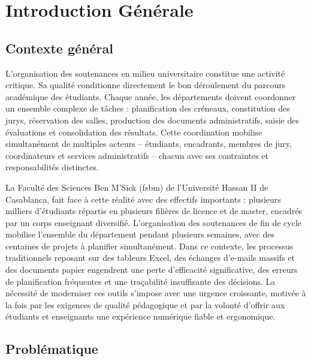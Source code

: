 \newpage
\section*{Introduction Générale}
\label{sec:introduction_generale}

\subsection*{Contexte général}
\label{intro:contexte}

L'organisation des soutenances en milieu universitaire constitue une activité critique. Sa qualité conditionne directement le bon déroulement du parcours académique des étudiants. Chaque année, les départements doivent coordonner un ensemble complexe de tâches : planification des créneaux, constitution des jurys, réservation des salles, production des documents administratifs, saisie des évaluations et consolidation des résultats. Cette coordination mobilise simultanément de multiples acteurs -- étudiants, encadrants, membres de jury, coordinateurs et services administratifs -- chacun avec ses contraintes et responsabilités distinctes.

La Faculté des Sciences Ben M'Sick (\gls{fsbm}) de l'Université Hassan II de Casablanca, fait face à cette réalité avec des effectifs importants : plusieurs milliers d'étudiants répartis en plusieurs filières de licence et de master, encadrés par un corps enseignant diversifié. L'organisation des soutenances de fin de cycle mobilise l'ensemble du département pendant plusieurs semaines, avec des centaines de projets à planifier simultanément. Dans ce contexte, les processus traditionnels reposant sur des tableurs Excel, des échanges d'e-mails massifs et des documents papier engendrent une perte d'efficacité significative, des erreurs de planification fréquentes et une traçabilité insuffisante des décisions. La nécessité de moderniser ces outils s'impose avec une urgence croissante, motivée à la fois par les exigences de qualité pédagogique et par la volonté d'offrir aux étudiants et enseignants une expérience numérique fiable et ergonomique.

\subsection*{Problématique}
\label{intro:problematique}


